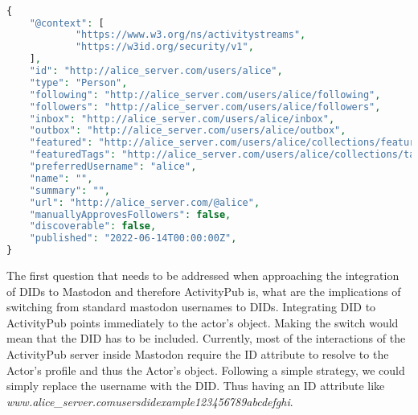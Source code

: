 \lstset{style=JSONStyle}
\begin{lstlisting}[language=PHP, caption=Alice's actor object, label=fig:alice_actor_object, float=h!]

{
	"@context": [
			"https://www.w3.org/ns/activitystreams",
			"https://w3id.org/security/v1",
	],
	"id": "http://alice_server.com/users/alice",
	"type": "Person",
	"following": "http://alice_server.com/users/alice/following",
	"followers": "http://alice_server.com/users/alice/followers",
	"inbox": "http://alice_server.com/users/alice/inbox",
	"outbox": "http://alice_server.com/users/alice/outbox",
	"featured": "http://alice_server.com/users/alice/collections/featured",
	"featuredTags": "http://alice_server.com/users/alice/collections/tags",
	"preferredUsername": "alice",
	"name": "",
	"summary": "",
	"url": "http://alice_server.com/@alice",
	"manuallyApprovesFollowers": false,
	"discoverable": false,
	"published": "2022-06-14T00:00:00Z",
}


\end{lstlisting}

The first question that needs to be addressed when approaching the integration of DIDs to Mastodon and therefore ActivityPub is, what are the implications of switching from standard mastodon usernames to DIDs. Integrating DID to ActivityPub points immediately to the actor's object. Making the switch would mean that the DID has to be included. Currently, most of the interactions of the ActivityPub server inside Mastodon require the ID attribute to resolve to the Actor's profile and thus the Actor's object. Following a simple strategy, we could simply replace the username with the DID. Thus having an ID attribute like \emph{www.alice\_server.com\/users\/did\:example\:123456789abcdefghi}.

